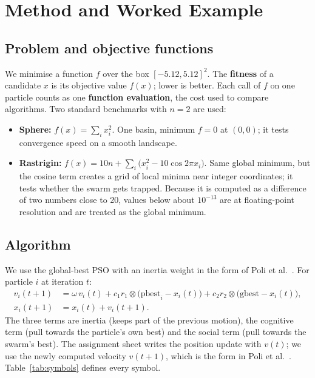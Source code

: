 \documentclass[11pt,a4paper]{article}
\newcommand{\pb}{\mathrm{pbest}}
\newcommand{\gb}{\mathrm{gbest}}
\begin{document}
\section{Method and Worked Example}\label{sec:method}

\subsection{Problem and objective functions}
We minimise a function $f$ over the box $[-5.12,5.12]^2$. The \textbf{fitness} of a candidate $x$ is its objective value $f(x)$; lower is better. Each call of $f$ on one particle counts as one \textbf{function evaluation}, the cost used to compare algorithms. Two standard benchmarks with $n=2$ are used:
\begin{itemize}
\item \textbf{Sphere:} $f(x)=\sum_i x_i^2$. One basin, minimum $f=0$ at $(0,0)$; it tests convergence speed on a smooth landscape.
\item \textbf{Rastrigin:} $f(x)=10n+\sum_i\bigl(x_i^2-10\cos 2\pi x_i\bigr)$. Same global minimum, but the cosine term creates a grid of local minima near integer coordinates; it tests whether the swarm gets trapped. Because it is computed as a difference of two numbers close to 20, values below about $10^{-13}$ are at floating-point resolution and are treated as the global minimum.
\end{itemize}

\subsection{Algorithm}\label{sec:algorithm}
We use the global-best PSO with an inertia weight in the form of Poli et al.~\cite[Eq.~2]{poli2007}. For particle $i$ at iteration $t$:
\begin{align}
v_i(t+1) &= \omega\, v_i(t) + c_1 r_1\otimes\bigl(\pb_i-x_i(t)\bigr) + c_2 r_2\otimes\bigl(\gb-x_i(t)\bigr),\label{eq:v}\\
x_i(t+1) &= x_i(t)+v_i(t+1).\label{eq:x}
\end{align}
The three terms are inertia (keeps part of the previous motion), the cognitive term (pull towards the particle's own best) and the social term (pull towards the swarm's best). The assignment sheet writes the position update with $v(t)$; we use the newly computed velocity $v(t+1)$, which is the form in Poli et al.~\cite{poli2007}. Table~\ref{tab:symbols} defines every symbol.
\end{document}
